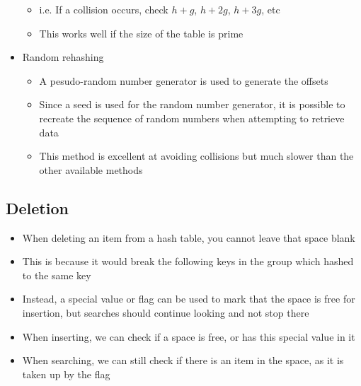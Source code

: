 \begin{itemize}
\begin{itemize}
    \item i.e. If a collision occurs, check $h + g$, $h + 2g$, $h + 3g$, etc
    \item This works well if the size of the table is prime
  \end{itemize}
  \item Random rehashing
  \begin{itemize}
    \item A pesudo-random number generator is used to generate the offsets
    \item Since a seed is used for the random number generator, it is possible to recreate the sequence of random numbers when attempting to retrieve data
    \item This method is excellent at avoiding collisions but much slower than the other available methods
  \end{itemize}
\end{itemize}

\subsection*{Deletion}

\begin{itemize}
  \item When deleting an item from a hash table, you cannot leave that space blank
  \item This is because it would break the following keys in the group which hashed to the same key
  \item Instead, a special value or flag can be used to mark that the space is free for insertion, but searches should continue looking and not stop there
  \item When inserting, we can check if a space is free, or has this special value in it
  \item When searching, we can still check if there is an item in the space, as it is taken up by the flag
\end{itemize}